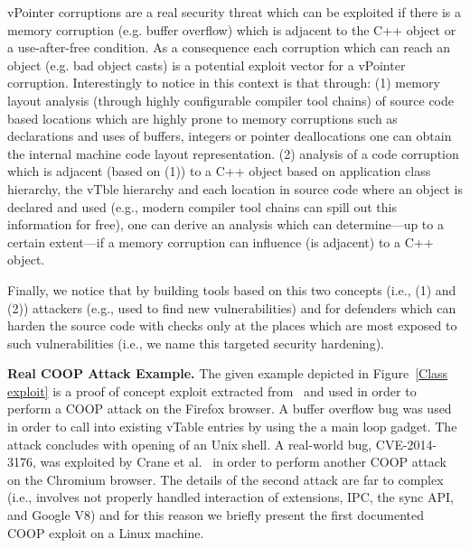 vPointer corruptions are a real security threat which can be exploited if there 
is a memory corruption (e.g. buffer overflow) which is adjacent to
the C++ object or a use-after-free condition. As a consequence each corruption 
which can reach an object (e.g. bad object casts) is a potential exploit vector 
for a vPointer corruption. Interestingly to notice in this context is that through:
(1) memory layout analysis (through highly configurable compiler tool chains) of 
source code based locations which are highly prone to
memory corruptions such as declarations and uses of buffers, integers or pointer 
deallocations one can obtain the internal machine code layout representation.
(2) analysis of a code corruption which is adjacent (based on (1)) to a C++ object based on
application class hierarchy, the vTble hierarchy and each location in source code where an object
is declared and used (e.g., modern compiler tool chains can spill out this information for free), 
one can derive an analysis which can determine---up to a certain extent---if a memory corruption 
can influence (is adjacent) to a C++ object.

Finally, we notice that by building tools based on this two concepts (i.e., (1) and (2))
attackers (e.g., used to find new vulnerabilities) and for defenders which can 
harden the source code with checks only at the places which are most exposed 
to such vulnerabilities (i.e., we name this targeted security hardening).

\textbf{Real COOP Attack Example.}
\label{Running Example: CVE X}
The given example depicted in Figure~\ref{Class exploit}
is a proof of concept exploit extracted from~\cite{schuster:coop} and used in order to perform 
a COOP attack on the Firefox browser. A buffer overflow bug was used in order to call 
into existing vTable entries by using the a main loop gadget. 
The attack concludes with opening of an Unix shell. 
A real-world bug, CVE-2014-3176, was exploited by Crane et al.~\cite{crane:readactor++}
in order to perform another COOP attack on the Chromium browser. The details of the 
second attack are far to complex (i.e., involves not properly handled interaction of 
extensions, IPC, the sync API, and Google V8) and for this reason we briefly present the first 
documented COOP exploit on a Linux machine.

